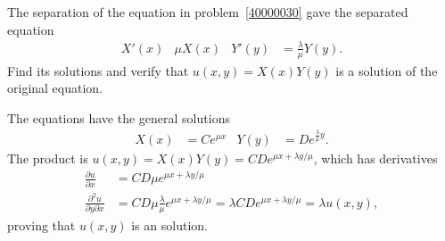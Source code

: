 The separation of the equation in problem~\ref{40000030} gave the
separated equation
\begin{align*}
X'(x) & \mu X(x)
&
Y'(y) &=\frac{\lambda}{\mu} Y(y).
\end{align*}
Find its solutions and verify that $u(x,y)= X(x)Y(y)$ is a solution
of the original equation.

\begin{loesung}
The equations have the general solutions
\begin{align*}
X(x) &= Ce^{\mu x}
&
Y(y) &= De^{\frac{\lambda}{\mu}y}.
\end{align*}
The product is $u(x,y)=X(x)Y(y) = CD e^{\mu x + \lambda y/\mu}$, which
has derivatives
\begin{align*}
\frac{\partial u}{\partial x}
&=
CD \mu e^{\mu x+\lambda y /\mu}
\\
\frac{\partial^2 u}{\partial y\partial x}
&=
CD \mu \frac{\lambda}{\mu} e^{\mu x+\lambda y /\mu}
=
\lambda CD e^{\mu x + \lambda y/\mu}
=
\lambda u(x,y),
\end{align*}
proving that $u(x,y)$ is an solution.
\end{loesung}
